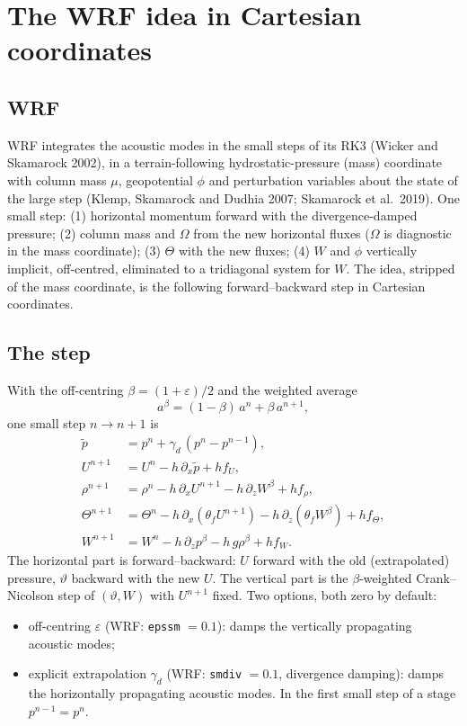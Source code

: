 \documentclass[11pt,a4paper]{article}
\newcommand{\code}[1]{\texttt{\small #1}}
\newcommand{\tv}{\vartheta}   %
\begin{document}
\section{The WRF idea in Cartesian coordinates}\label{sec:wrf}
\subsection{WRF}
WRF integrates the acoustic modes in the small steps of its RK3 (Wicker and Skamarock 2002), in a
terrain-following hydrostatic-pressure (mass) coordinate with column mass $\mu$, geopotential $\phi$
and perturbation variables about the state of the large step (Klemp, Skamarock and Dudhia 2007;
Skamarock et al.\ 2019). One small step: (1) horizontal momentum forward with the divergence-damped
pressure; (2) column mass and $\Omega$ from the new horizontal fluxes ($\Omega$ is diagnostic in the mass
coordinate); (3) $\Theta$ with the new fluxes; (4) $W$ and $\phi$ vertically implicit, off-centred, eliminated to a
tridiagonal system for $W$. The idea, stripped of the mass coordinate, is the following
forward--backward step in Cartesian coordinates.

\subsection{The step}
With the off-centring $\beta=(1+\varepsilon)/2$ and the weighted average
\[
a^\beta=(1-\beta)\,a^n+\beta\,a^{n+1},
\]
one small step $n\to n+1$ is
\begin{align}
\tilde p&=p^n+\gamma_d\,(p^n-p^{n-1}),\label{eq:wrf0}\\
U^{n+1}&=U^n-h\,\partial_x\tilde p+hf_U,\label{eq:wrf1}\\
\rho^{n+1}&=\rho^n-h\,\partial_xU^{n+1}-h\,\partial_zW^\beta+hf_\rho,\label{eq:wrf2}\\
\Theta^{n+1}&=\Theta^n-h\,\partial_x(\theta_fU^{n+1})-h\,\partial_z(\theta_fW^\beta)+hf_\Theta,\label{eq:wrf3}\\
W^{n+1}&=W^n-h\,\partial_zp^\beta-h\,g\rho^\beta+hf_W .\label{eq:wrf4}
\end{align}
The horizontal part is forward--backward: $U$ forward with the old (extrapolated) pressure, $\tv$ backward
with the new $U$. The vertical part is the $\beta$-weighted Crank--Nicolson step of $(\tv,W)$ with $U^{n+1}$ fixed.
Two options, both zero by default:
\begin{itemize}
\item off-centring $\varepsilon$ (WRF: \code{epssm} $=0.1$): damps the vertically propagating acoustic modes;
\item explicit extrapolation $\gamma_d$ (WRF: \code{smdiv} $=0.1$, divergence damping): damps the horizontally
propagating acoustic modes. In the first small step of a stage $p^{n-1}=p^n$.
\end{itemize}
\end{document}

